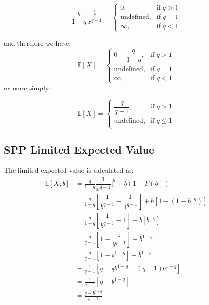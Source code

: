 \[
\frac{q}{1-q} \dfrac{1}{x^{q-1}} = 
\begin{cases}
0,& \text{if } q > 1\\
\text{undefined},& \text{if } q = 1\\         
\infty, & \text{if }q < 1
\end{cases}
\]

and therefore we have: 
\[
\mathbb{E}[X]  = 
\begin{cases}
0 - \dfrac{q}{1-q},& \text{if } q > 1\\
\text{undefined},& \text{if } q = 1\\         
\infty, & \text{if }q < 1
\end{cases}
\]
or more simply:

\begin{equation}
\mathbb{E}[X]  = 
\begin{cases}
\dfrac{q}{q-1},& \text{if } q > 1\\
\text{undefined},& \text{if } q \leq 1\\         
\end{cases}
\end{equation}

\subsection{SPP Limited Expected Value}\label{ParetoLEV}

The limited expected value is calculated as:
\begin{align}
	\mathbb{E}[X;b] 	&= \frac{q}{1-q} \dfrac{1}{x^{q-1}} \Big|_{1}^{b} + b  (1-F(b))\nonumber\\
 	&=  \frac{q}{1-q} \left[ \dfrac{1}{b^{q-1}} - \dfrac{1}{1^{q-1}}\right]+  b  \left[1-(1-b^{-q})\right]\nonumber\\
 	&=  \frac{q}{1-q} \left[ \dfrac{1}{b^{q-1}} - 1\right]+  b  \left[b^{-q}\right]\nonumber\\
 	&=  \frac{q}{q-1} \left[1 - \dfrac{1}{b^{q-1}}\right]+ b^{1-q}\nonumber\\
 	&=  \frac{q}{q-1} \left[1 - b^{1-q}\right]+b^{1-q}\\ %
 	&=  \frac{1}{q-1} \left[q - qb^{1-q} + (q-1)b^{1-q}\right]\nonumber\\
 	&=  \frac{1}{q-1} \left[q - b^{1-q}\right]\nonumber\\
 	&=	\frac{q - b^{1-q}}{q-1}\label{eqn:ParetoLEV}
\end{align}
\newpage

